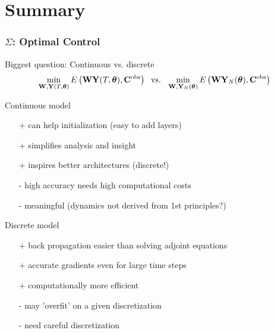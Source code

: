 \documentclass[12pt,fleqn, beamer]{beamer}
\begin{document}
\section{Summary} %
\label{sec:numerical_optimization}
\begin{frame}[fragile]\frametitle{$\Sigma$: Optimal Control}

Biggest question: Continuous vs. discrete
$$ \min_{{\bf W}, {\bf Y}(T,{\boldsymbol \theta})}E\left(
{\bf W} {\bf Y}(T,{\boldsymbol \theta}),{\bf C}^{\rm obs}\right) 
\; \text{ vs. }\;
 \min_{{\bf W}, {\bf Y}_N({\boldsymbol \theta})}E\left(
{\bf W} {\bf Y}_N({\boldsymbol \theta}),{\bf C}^{\rm obs}\right) $$

Continuous model
\begin{itemize}
	\item[+] can help initialization (easy to add layers)
	\item[+] simplifies analysis and insight
	\item[+] inspires better architectures (discrete!)
	\item[-] high accuracy needs high computational costs
	\item[-] meaningful (dynamics not derived from 1st principles?)
\end{itemize}

Discrete model
\begin{itemize}
	\item[+] back propagation easier than solving adjoint equations
	\item[+] accurate gradients even for large time steps
	\item[+] computationally more efficient
	\item[-] may 'overfit' on a given discretization
	\item[-] need careful discretization
\end{itemize}

\end{frame}
\end{document}
